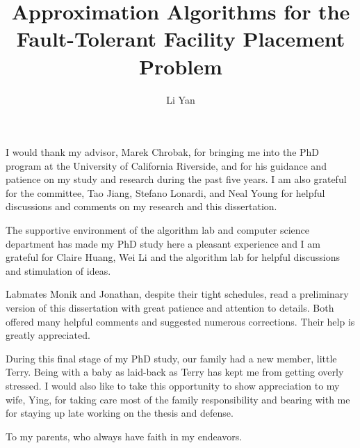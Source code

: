 \documentclass[oneside,final]{ucr}
\begin{document}

\title{Approximation Algorithms for the Fault-Tolerant Facility Placement Problem}
\author{Li Yan}

\maketitle
\copyrightpage{}
\approvalpage{}


\begin{frontmatter}

\begin{acknowledgements}
  I would thank my advisor, Marek Chrobak, for bringing me
  into the PhD program at the University of California
  Riverside, and for his guidance and patience on my study
  and research during the past five years. I am also
  grateful for the committee, Tao Jiang, Stefano Lonardi,
  and Neal Young for helpful discussions and comments on my
  research and this dissertation.

  The supportive environment of the algorithm lab and
  computer science department has made my PhD study here a
  pleasant experience and I am grateful for Claire Huang,
  Wei Li and the algorithm lab for helpful discussions and
  stimulation of ideas.

  Labmates Monik and Jonathan, despite their tight
  schedules, read a preliminary version of this dissertation
  with great patience and attention to details. Both offered
  many helpful comments and suggested numerous
  corrections. Their help is greatly appreciated.

  During this final stage of my PhD study, our family had a
  new member, little Terry. Being with a baby as laid-back
  as Terry has kept me from getting overly stressed. I would
  also like to take this opportunity to show appreciation to
  my wife, Ying, for taking care most of the family
  responsibility and bearing with me for staying up late
  working on the thesis and defense.
\end{acknowledgements}

\begin{dedication}
\null\vfil
{\large
\begin{center}
  To my parents, who always have faith in my endeavors.
\end{center}}
\vfil\null
\end{dedication}


\end{frontmatter}
\end{document}
